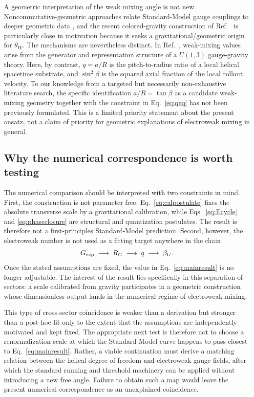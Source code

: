 \documentclass[aps,prd,reprint,nofootinbib,floatfix]{revtex4-2}
\begin{document}
A geometric interpretation of the weak mixing angle is not new.  Noncommutative-geometric approaches relate Standard-Model gauge couplings to deeper geometric data \cite{Connes2006,ChamseddineConnesMarcolli2006}, and the recent colored-gravity construction of Ref.~\cite{Monjo2025} is particularly close in motivation because it seeks a gravitational/geometric origin for $\theta_W$.  The mechanisms are nevertheless distinct.  In Ref.~\cite{Monjo2025}, weak-mixing values arise from the generator and representation structure of a $U(1,3)$ gauge-gravity theory.  Here, by contrast, $q=a/R$ is the pitch-to-radius ratio of a local helical spacetime substrate, and $\sin^2\beta$ is the squared axial fraction of the local rollout velocity.  To our knowledge from a targeted but necessarily non-exhaustive literature search, the specific identification $a/R=\tan\beta$ as a candidate weak-mixing geometry together with the constraint in Eq.~\eqref{eq:qeq} has not been previously formulated.  This is a limited priority statement about the present ansatz, not a claim of priority for geometric explanations of electroweak mixing in general.

\subsection{Why the numerical correspondence is worth testing}

The numerical comparison should be interpreted with two constraints in mind.  First, the construction is not parameter free: Eq.~\eqref{eq:calpostulate} fixes the absolute transverse scale by a gravitational calibration, while Eqs.~\eqref{eq:Ecycle} and \eqref{eq:phaseclosure} are structural and quantization postulates.  The result is therefore not a first-principles Standard-Model prediction.  Second, however, the electroweak number is not used as a fitting target anywhere in the chain
\begin{equation}
G_{\rm exp}\;\longrightarrow\;R_G\;\longrightarrow\;q\;\longrightarrow\;\beta_G.
\label{eq:inferencechain}
\end{equation}
Once the stated assumptions are fixed, the value in Eq.~\eqref{eq:mainresult} is no longer adjustable.  The interest of the result lies specifically in this separation of sectors: a scale calibrated from gravity participates in a geometric construction whose dimensionless output lands in the numerical regime of electroweak mixing.

This type of cross-sector coincidence is weaker than a derivation but stronger than a post-hoc fit only to the extent that the assumptions are independently motivated and kept fixed.  The appropriate next test is therefore not to choose a renormalization scale at which the Standard-Model curve happens to pass closest to Eq.~\eqref{eq:mainresult}.  Rather, a viable continuation must derive a matching relation between the helical degree of freedom and electroweak gauge fields, after which the standard running and threshold machinery \cite{ErlerFerroKuberski2024,SpiesbergerWezorke2024} can be applied without introducing a new free angle.  Failure to obtain such a map would leave the present numerical correspondence as an unexplained coincidence.
\end{document}
